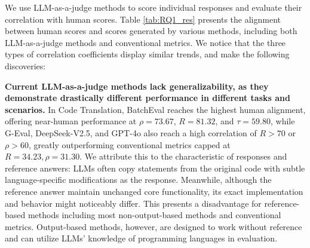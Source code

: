 We use LLM-as-a-judge methods to score individual responses and evaluate their correlation with human scores. Table \ref{tab:RQ1_res} presents the alignment between human scores and scores generated by various methods, including both LLM-as-a-judge methods and conventional metrics.
We notice that the three types of correlation coefficients display similar trends, and make the following discoveries:

\textbf{Current LLM-as-a-judge methods lack generalizability, as they demonstrate drastically different performance in different tasks and scenarios.} In Code Translation, BatchEval reaches the highest human alignment, offering near-human performance at \(\rho=73.67\), \(R=81.32\), and \(\tau=59.80\), while G-Eval, DeepSeek-V2.5, and GPT-4o also reach a high correlation of \(R>70\) or \(\rho>60\), greatly outperforming conventional metrics capped at \(R=34.23,\rho=31.30\). We attribute this to the characteristic of responses and reference answers: LLMs often copy statements from the original code with subtle language-specific modifications as the response. Meanwhile, although the reference answer maintain unchanged core functionality, its exact implementation and behavior might noticeably differ. This presents a disadvantage for reference-based methods including most non-output-based methods and conventional metrics. Output-based methods, however, are designed to work without reference and can utilize LLMs' knowledge of programming languages in evaluation.

